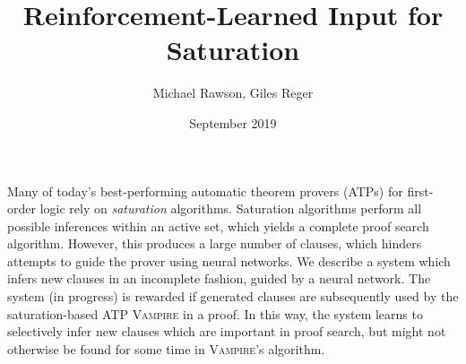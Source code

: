\documentclass[24pt, a1paper, portrait]{tikzposter}
\title{Reinforcement-Learned Input for Saturation}
\author{Michael Rawson, Giles Reger}
\date{September 2019}
\institute{University of Manchester, UK}
\newcommand{\vampire}{\textsc{Vampire}}
\begin{document}
\maketitle

{
	Many of today's best-performing automatic theorem provers (ATPs) for first-order logic rely on \emph{saturation} algorithms.
	Saturation algorithms perform all possible inferences within an active set, which yields a complete proof search algorithm.
	However, this produces a large number of clauses, which hinders attempts to guide the prover using neural networks.
	We describe a system which infers new clauses in an incomplete fashion, guided by a neural network.
	The system (in progress) is rewarded if generated clauses are subsequently used by the saturation-based ATP \vampire{} in a proof.
	In this way, the system learns to selectively infer new clauses which are important in proof search, but might not otherwise be found for some time in \vampire{}'s algorithm.

}
\end{document}

